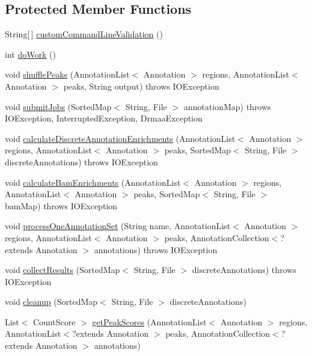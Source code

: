 \subsection*{Protected Member Functions}
\begin{DoxyCompactItemize}
\item 
String\mbox{[}$\,$\mbox{]} \hyperlink{classbroad_1_1pda_1_1seq_1_1rap_1_1_collect_annotation_enrichments_a042956bda14093b8ce0f448921d6ba18}{custom\+Command\+Line\+Validation} ()
\item 
int \hyperlink{classbroad_1_1pda_1_1seq_1_1rap_1_1_collect_annotation_enrichments_aca90aa592038309a60344ccc5caec0f4}{do\+Work} ()
\item 
void \hyperlink{classbroad_1_1pda_1_1seq_1_1rap_1_1_collect_annotation_enrichments_aba7f1f25cb7a629a27fde2c4d3c8105c}{shuffle\+Peaks} (Annotation\+List$<$ Annotation $>$ regions, Annotation\+List$<$ Annotation $>$ peaks, String output)  throws I\+O\+Exception 
\item 
void \hyperlink{classbroad_1_1pda_1_1seq_1_1rap_1_1_collect_annotation_enrichments_ab1badfd95c8ead4c614a17731e449110}{submit\+Jobs} (Sorted\+Map$<$ String, File $>$ annotation\+Map)  throws I\+O\+Exception, Interrupted\+Exception, Drmaa\+Exception 
\item 
void \hyperlink{classbroad_1_1pda_1_1seq_1_1rap_1_1_collect_annotation_enrichments_a21202bc9f043306a502cbe9c22299225}{calculate\+Discrete\+Annotation\+Enrichments} (Annotation\+List$<$ Annotation $>$ regions, Annotation\+List$<$ Annotation $>$ peaks, Sorted\+Map$<$ String, File $>$ discrete\+Annotations)  throws I\+O\+Exception 
\item 
void \hyperlink{classbroad_1_1pda_1_1seq_1_1rap_1_1_collect_annotation_enrichments_a526e950c4fd241ba6a4850d88a5931aa}{calculate\+Bam\+Enrichments} (Annotation\+List$<$ Annotation $>$ regions, Annotation\+List$<$ Annotation $>$ peaks, Sorted\+Map$<$ String, File $>$ bam\+Map)  throws I\+O\+Exception 
\item 
void \hyperlink{classbroad_1_1pda_1_1seq_1_1rap_1_1_collect_annotation_enrichments_a63fdd32080696170a9aff6c1763e8f97}{process\+One\+Annotation\+Set} (String name, Annotation\+List$<$ Annotation $>$ regions, Annotation\+List$<$ Annotation $>$ peaks, Annotation\+Collection$<$?extends Annotation $>$ annotations)  throws I\+O\+Exception 
\item 
void \hyperlink{classbroad_1_1pda_1_1seq_1_1rap_1_1_collect_annotation_enrichments_a06a833e59342a9dcf6df6ef6d283a794}{collect\+Results} (Sorted\+Map$<$ String, File $>$ discrete\+Annotations)  throws I\+O\+Exception 
\item 
void \hyperlink{classbroad_1_1pda_1_1seq_1_1rap_1_1_collect_annotation_enrichments_a36bfbc9033accd19863195a27a170eaa}{cleanup} (Sorted\+Map$<$ String, File $>$ discrete\+Annotations)
\item 
List$<$ Count\+Score $>$ \hyperlink{classbroad_1_1pda_1_1seq_1_1rap_1_1_collect_annotation_enrichments_a608e157802fd681c674d43c4ae81fa3b}{get\+Peak\+Scores} (Annotation\+List$<$ Annotation $>$ regions, Annotation\+List$<$?extends Annotation $>$ peaks, Annotation\+Collection$<$?extends Annotation $>$ annotations)
\end{DoxyCompactItemize}
